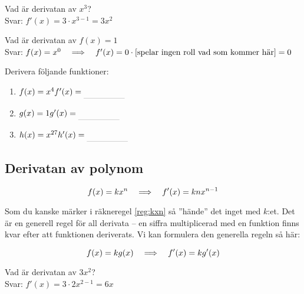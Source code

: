 \documentclass[a4paper, 12pt]{article}
\begin{document}
\begin{exempel}
    Vad är derivatan av $x^3$?\\
    Svar: $f'(x) = 3\cdot x^{3-1} = 3x^2$
\end{exempel}


\begin{exempel}
    Vad är derivatan av $f(x) = 1$\\
    Svar: $f(x) = x^0 \hspace{1em} \Longrightarrow \hspace{1em} f'(x) = 0 \cdot \left [ \text{spelar ingen roll vad som kommer här}\right] = 0$
\end{exempel}

\begin{uppgifter}
    \label{upp:x^n}
    Derivera följande funktioner:
    \begin{multicols}{3}
        \begin{enumerate}
            \item $f(x) = x^4 \\ f'(x) \ans$
            \item $g(x) = 1 \\ g'(x) \ans$
            \item $h(x) = x^{27} \\ h'(x) \ans$
        \end{enumerate}
    \end{multicols}
\end{uppgifter}

\subsection{Derivatan av polynom}

\begin{regel}
    \label{reg:kxn}
    \[f(x) = kx^n \hspace{1em} \Longrightarrow \hspace{1em} f'(x) = knx^{n-1}\]
\end{regel}
Som du kanske märker i räkneregel \ref*{reg:kxn} så ''hände'' det inget med $k$:et. Det är en generell regel för all derivata -- en siffra multiplicerad med en funktion finns kvar efter att funktionen deriverats. Vi kan formulera den generella regeln så här:

\begin{regel}
    \label{reg:kf(x)}
    \[ f(x) = k g(x) \hspace{1em} \Longrightarrow \hspace{1em} f'(x) = k g'(x) \]
\end{regel}

\begin{exempel}
    Vad är derivatan av $3x^2$? \\ Svar: $f'(x) = 3\cdot 2x^{2-1} = 6x$
\end{exempel}
\end{document}
